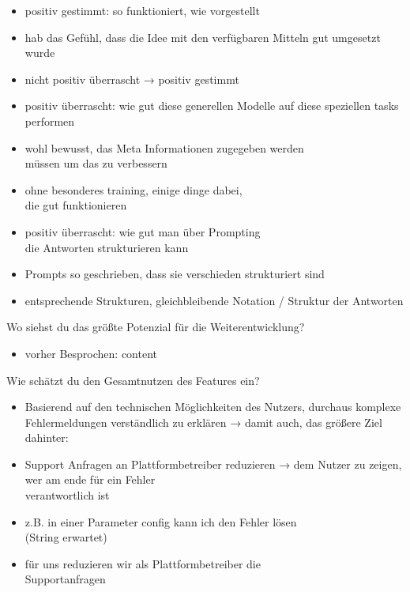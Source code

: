 \documentclass[
  a4paper,
  12pt,
  oneside,
  open=any,
  BCOR=12mm,
  DIV=14,
  parskip=half*,
  headsepline,
  footsepline,
  pointlessnumbers,
  liststotoc,
  numbers=noenddot,
  listof=totoc]{scrartcl}
\providecommand{\tightlist}{%
  \setlength{\itemsep}{0pt}\setlength{\parskip}{0pt}}\usepackage{longtable,booktabs,array}
\begin{document}
\begin{itemize}
\tightlist
\item
  positiv gestimmt: so funktioniert, wie vorgestellt
\item
  hab das Gefühl, dass die Idee mit den verfügbaren Mitteln gut
  umgesetzt wurde
\item
  nicht positiv überrascht → positiv gestimmt
\item
  positiv überrascht: wie gut diese generellen Modelle auf diese
  speziellen tasks performen
\item
  wohl bewusst, das Meta Informationen zugegeben werden\\
  müssen um das zu verbessern
\item
  ohne besonderes training, einige dinge dabei,\\
  die gut funktionieren
\item
  positiv überrascht: wie gut man über Prompting\\
  die Antworten strukturieren kann
\item
  Prompts so geschrieben, dass sie verschieden strukturiert sind
\item
  entsprechende Strukturen, gleichbleibende Notation / Struktur der
  Antworten
\end{itemize}

Wo siehst du das größte Potenzial für die Weiterentwicklung?

\begin{itemize}
\tightlist
\item
  vorher Besprochen: content
\end{itemize}

Wie schätzt du den Gesamtnutzen des Features ein?

\begin{itemize}
\tightlist
\item
  Basierend auf den technischen Möglichkeiten des Nutzers, durchaus
  komplexe Fehlermeldungen verständlich zu erklären → damit auch, das
  größere Ziel dahinter:
\item
  Support Anfragen an Plattformbetreiber reduzieren → dem Nutzer zu
  zeigen, wer am ende für ein Fehler\\
  verantwortlich ist
\item
  z.B. in einer Parameter config kann ich den Fehler lösen\\
  (String erwartet)
\item
  für uns reduzieren wir als Plattformbetreiber die\\
  Supportanfragen
\end{itemize}
\end{document}
